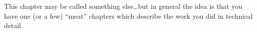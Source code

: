 This chapter may be called something else\ldots but in general 
the idea is that you have one (or a few) ``meat'' chapters which
describe the work you did in technical detail.